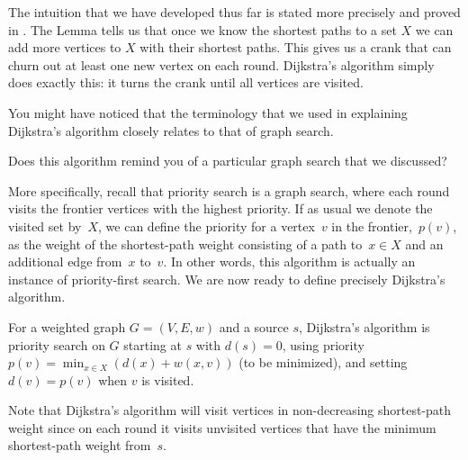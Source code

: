 The intuition that we have developed thus far is stated more precisely
and proved in .  
%
The Lemma tells us that once we know
the shortest paths to a set $X$ we can add more vertices to $X$ with
their shortest paths.  This gives us a crank that can churn out at
least one new vertex on each round. Dijkstra's algorithm simply does
exactly this: it turns the crank until all vertices are visited.


You might have noticed that the terminology that we used in explaining
Dijkstra's algorithm closely relates to that of graph search.
%
\begin{question}
  Does this algorithm remind you of a particular graph search that we
  discussed?
\end{question}
%
More specifically, recall that priority search is a graph search,
where each round visits the frontier vertices with the highest
priority.  
%
If as usual we denote the visited set by~$X$, we can define the
priority for a vertex~$v$ in the frontier,~$p(v)$, as the weight of
the shortest-path weight consisting of a path to~$x \in X$ and an
additional edge from~$x$ to~$v$.  In other words, this algorithm is
actually an instance of priority-first search.
%
We are now ready to define precisely Dijkstra's algorithm.
\begin{algorithm}
  For a weighted graph $G=(V,E,w)$ and a source $s$, Dijkstra's
  algorithm is priority search on $G$ starting at $s$ with $d(s) = 0$,
  using priority $\displaystyle p(v) = \min_{x \in X} (d(x) + w(x,v))$
  (to be minimized), and setting $d(v) = p(v)$ when $v$ is visited.
\end{algorithm}
%
Note that Dijkstra's algorithm will visit vertices in non-decreasing
shortest-path weight since on each round it visits unvisited vertices
that have the minimum shortest-path weight from~$s$.


\begin{comment}
\begin{figure}
\begin{pseudocode}
~\\
\begin{lstlisting}
function $\sssppd(G, s) =$ 
let
   $D = \cset{s \mapsto 0}$     
   $F = N(s)$        % the frontier
  while $|F| \neq 0$ with $(D,F)$     % $D$ is a table from $v \in X$ to $\dist_G(s,v)$ 
     $\displaystyle D_F = \cset{y \mapsto \min_{(x \mapsto d) \in D}(d + w(x,y)) : y \in F}$
     $\displaystyle d_{XY} = \min_{(y \mapsto d) \in D_F} d$
     $Y = \csetf{(y \mapsto d) \in D_F}{d = d_{XY}}$
     $D = D \cup Y$
     $F = (F \cup N_G(Y)) \setminus \mbox{domain}(D)$
in
  $X$
end
\end{lstlisting}
\label{alg:pfsdjk}
\end{pseudocode}
\end{figure}
\end{comment}



